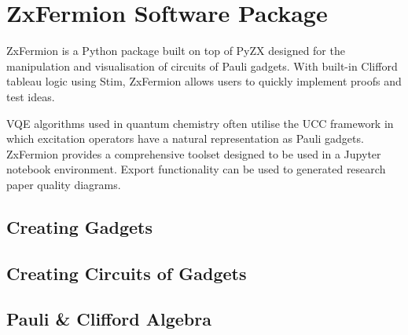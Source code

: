 \chapter{ZxFermion Software Package}

ZxFermion is a Python package built on top of PyZX designed for the manipulation and visualisation of circuits of Pauli gadgets. With built-in Clifford tableau logic using Stim, ZxFermion allows users to quickly implement proofs and test ideas.

VQE algorithms used in quantum chemistry often utilise the UCC framework in which excitation operators have a natural representation as Pauli gadgets. ZxFermion provides a comprehensive toolset designed to be used in a Jupyter notebook environment. Export functionality can be used to generated research paper quality diagrams.

\section{Creating Gadgets}
\section{Creating Circuits of Gadgets}
\section{Pauli \& Clifford Algebra}
